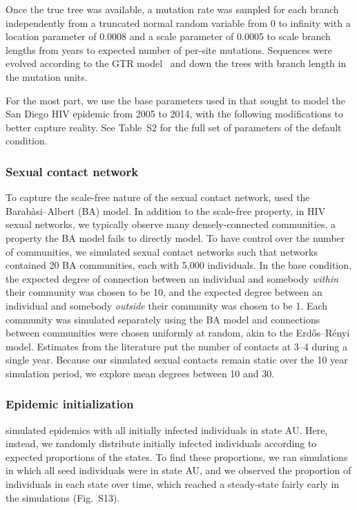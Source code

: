 \documentclass[a4paper,11pt]{article}
\newcommand{\authorcite}[1]{\citeauthor{#1}\supercite{#1}}
\begin{document}
Once the true tree was available, a mutation rate was sampled for each branch independently from a truncated normal random variable from 0 to infinity with a location parameter of 0.0008 and a scale parameter of 0.0005 to scale branch lengths from years to expected number of per-site mutations.\supercite{Moshiri2018}
Sequences were evolved according to the GTR model~\supercite{gtr} and down the trees with branch length in the mutation units.

For the most part, we use the base parameters used in \authorcite{Moshiri2018} that sought to model the San Diego HIV epidemic from 2005 to 2014, with the following modifications to better capture reality. See Table~S2 for the full set of parameters of the default condition.

\subsubsection{Sexual contact network}
To capture the scale-free nature of the sexual contact network, \authorcite{Moshiri2018} used the Barab\`asi--Albert (BA) model.\supercite{Barabasi1999}
In addition to the scale-free property, in HIV sexual networks, we typically observe many densely-connected communities,\supercite{Rothenberg1998} a property the BA model fails to directly model.
To have control over the number of communities,  we simulated sexual contact networks such that networks contained 20 BA communities,
each with 5,000 individuals.
In the base condition, the expected degree of connection between an individual and somebody \textit{within} their community was chosen to be 10,
and the expected degree between an individual and somebody \textit{outside} their community was chosen to be 1. 
Each community was simulated separately using the BA model and connections between communities were chosen uniformly at random, akin to the Erd\H os--R\'enyi model.\supercite{Erdos1959}
Estimates from the literature put the number of contacts at 3--4 during a single year.\supercite{Rosenberg2011}
Because our simulated sexual contacts remain static over the 10 year simulation period, we explore mean degrees between 10 and 30.

\subsubsection{Epidemic initialization}
\authorcite{Moshiri2018} simulated epidemics with all initially infected individuals in state AU.
Here, instead,
we randomly distribute initially infected individuals according to expected proportions of the states. To find these proportions, we ran simulations in which all seed individuals were in state AU, and we observed the proportion of individuals in each state over time, which reached a steady-state fairly early in the simulations (Fig.~S13).
\end{document}
